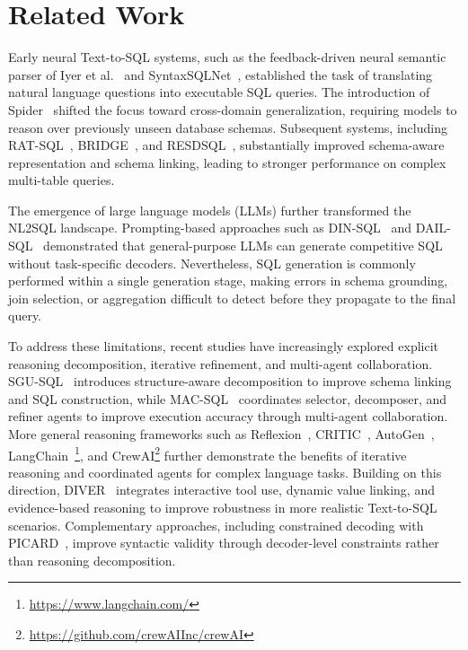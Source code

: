 \documentclass{svproc}
\begin{document}

\section{Related Work}
\label{sec:related}

Early neural Text-to-SQL systems, such as the feedback-driven neural semantic parser of Iyer et al.~\cite{iyer2017neural} and SyntaxSQLNet~\cite{yu2018syntaxsqlnet}, established the task of translating natural language questions into executable SQL queries. The introduction of Spider~\cite{yu2018spider} shifted the focus toward cross-domain generalization, requiring models to reason over previously unseen database schemas. Subsequent systems, including RAT-SQL~\cite{wang2020ratsql}, BRIDGE~\cite{lin2020bridge}, and RESDSQL~\cite{li2023resdsql}, substantially improved schema-aware representation and schema linking, leading to stronger performance on complex multi-table queries.


The emergence of large language models (LLMs) further transformed the NL2SQL landscape. Prompting-based approaches such as DIN-SQL~\cite{pourreza2023dinsql} and DAIL-SQL~\cite{gao2023dailsql} demonstrated that general-purpose LLMs can generate competitive SQL without task-specific decoders. Nevertheless, SQL generation is commonly performed within a single generation stage, making errors in schema grounding, join selection, or aggregation difficult to detect before they propagate to the final query.

To address these limitations, recent studies have increasingly explored explicit reasoning decomposition, iterative refinement, and multi-agent collaboration. SGU-SQL~\cite{zhang2025sgusql} introduces structure-aware decomposition to improve schema linking and SQL construction, while MAC-SQL~\cite{wang2025macsql} coordinates selector, decomposer, and refiner agents to improve execution accuracy through multi-agent collaboration. More general reasoning frameworks such as Reflexion~\cite{shinn2023reflexion}, CRITIC~\cite{gou2024critic}, AutoGen~\cite{wang2023autogen}, LangChain~\footnote{\url{https://www.langchain.com/}}, and CrewAI\footnote{\url{https://github.com/crewAIInc/crewAI}} further demonstrate the benefits of iterative reasoning and coordinated agents for complex language tasks. Building on this direction, DIVER~\cite{nan2026diver} integrates interactive tool use, dynamic value linking, and evidence-based reasoning to improve robustness in more realistic Text-to-SQL scenarios. Complementary approaches, including constrained decoding with PICARD~\cite{scholak2021picard}, improve syntactic validity through decoder-level constraints rather than reasoning decomposition.
\end{document}
